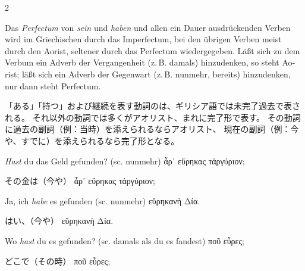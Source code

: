 \begin{paracol}{2}
\begin{enumerate}[leftmargin=0pt,rightmargin=0pt,listparindent =1cm,labelindent=1cm,labelsep=1ex,labelwidth={*},itemindent={*},align=left]
\begin{german}
Das \emph{Perfectum} von \emph{sein} und \emph{haben} und allen ein
Dauer ausdrückenden Verben wird im Griechischen durch das Imperfectum,
bei den übrigen Verben meist durch den Aorist, seltener durch das
Perfectum wiedergegeben. Läßt sich zu dem Verbum ein Adverb der Vergangenheit
(z.\,B. damals) hinzudenken, so steht Aorist; läßt sich ein Adverb
der Gegenwart (z.\,B. nunmehr, bereits) hinzudenken, nur dann steht
Perfectum.
\end{german}
\switchcolumn

\begin{japanese}
「ある」「持つ」および継続を表す動詞のは、ギリシア語では未完了過去で表される。
それ以外の動詞では多くがアオリスト、まれに完了形で表す。
その動詞に過去の副詞（例：当時）を添えられるならアオリスト、
現在の副詞（例：今や、すでに）を添えられるなら完了形となる。
\end{japanese}
\switchcolumn*

\begin{continuousexamples}%
\begin{german}%
\emph{Hast} du das Geld gefunden? (\textlatin{sc.}
nunmehr) \textgreek[variant=ancient]{ἆρ᾽ εὕρηκας τἀργύριον;}
\end{german}
\switchcolumn

\begin{japanese}
その金は（今や） \textgreek[variant=ancient]{ἆρ᾽ εὕρηκας τἀργύριον;}
\end{japanese}
\switchcolumn*

\begin{german}
Ja, ich \emph{habe} es gefunden (\textlatin{sc.} nunmehr) \textgreek[variant=ancient]{εὕρηκανὴ
Δία.}
\end{german}
\switchcolumn

\begin{japanese}
はい、（今や） \textgreek[variant=ancient]{εὕρηκανὴ Δία.}
\end{japanese}
\switchcolumn*

\begin{german}
Wo \emph{hast} du es gefunden? (\textlatin{sc.} damals als du es fandest)
\textgreek[variant=ancient]{ποῦ εὗρες;}
\end{german}
\switchcolumn

\begin{japanese}
どこで（その時） \textgreek[variant=ancient]{ποῦ εὗρες;}
\end{japanese}
\switchcolumn*


\end{continuousexamples}
\end{enumerate}
\end{paracol}
